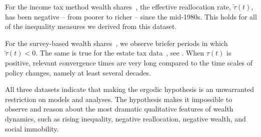 For the income tax method wealth shares~\cite{SaezZucman2014}, the effective reallocation rate, $\widetilde{\tau}\left(t\right)$, has been negative -- \ie from poorer to richer -- since the mid-1980s. This holds for all of the inequality measures we derived from this dataset.


For the survey-based wealth shares~\cite{bricker2016measuring2}, we observe briefer periods in which $\widetilde{\tau}\left(t\right) < 0$. The same is true for the estate tax data~\cite{kopczuk2004top}, see . When $\tau\left(t\right)$ is positive, relevant convergence times are very long compared to the time scales of policy changes, namely at least several decades.


All three datasets indicate that making the ergodic hypothesis is an unwarranted restriction on models and analyses. The hypothesis makes it impossible to observe and reason about the most dramatic qualitative features of wealth dynamics, such as rising inequality, negative reallocation, negative wealth, and social immobility.

